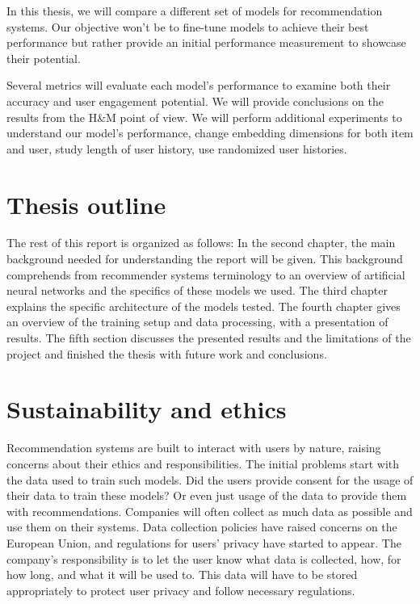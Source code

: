 \documentclass{kththesis}
\begin{document}
In this thesis, we will compare a different set of models for recommendation systems. Our objective won't be to fine-tune models to achieve their best performance but rather provide an initial performance measurement to showcase their potential.

Several metrics will evaluate each model's performance to examine both their accuracy and user engagement potential. We will provide conclusions on the results from the H\&M point of view. We will perform additional experiments to understand our model's performance, change embedding dimensions for both item and user, study length of user history, use randomized user histories.

\section{Thesis outline}
The rest of this report is organized as follows: In the second chapter, the main background needed for understanding the report will be given. This background comprehends from recommender systems terminology to an overview of artificial neural networks and the specifics of these models we used. The third chapter explains the specific architecture of the models tested. The fourth chapter gives an overview of the training setup and data processing, with a presentation of results. The fifth section discusses the presented results and the limitations of the project and finished the thesis with future work and conclusions.

\section{Sustainability and ethics}
Recommendation systems are built to interact with users by nature, raising concerns about their ethics and responsibilities. The initial problems start with the data used to train such models. Did the users provide consent for the usage of their data to train these models? Or even just usage of the data to provide them with recommendations. Companies will often collect as much data as possible and use them on their systems. Data collection policies have raised concerns on the European Union, and regulations for users' privacy have started to appear\cite{EUdataregulations2018}. The company's responsibility is to let the user know what data is collected, how, for how long, and what it will be used to. This data will have to be stored appropriately to protect user privacy and follow necessary regulations.
\end{document}
